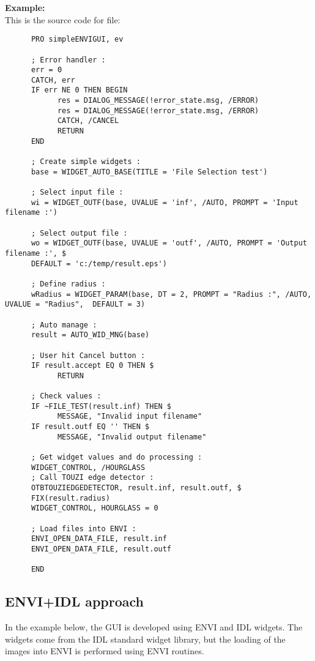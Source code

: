\textbf{Example:}\\
      This is the source code for  file:\\
\begin{verbatim}
      PRO simpleENVIGUI, ev

      ; Error handler :
      err = 0
      CATCH, err
      IF err NE 0 THEN BEGIN
            res = DIALOG_MESSAGE(!error_state.msg, /ERROR)
            res = DIALOG_MESSAGE(!error_state.msg, /ERROR)
            CATCH, /CANCEL
            RETURN
      END

      ; Create simple widgets :
      base = WIDGET_AUTO_BASE(TITLE = 'File Selection test')

      ; Select input file :
      wi = WIDGET_OUTF(base, UVALUE = 'inf', /AUTO, PROMPT = 'Input filename :')

      ; Select output file :
      wo = WIDGET_OUTF(base, UVALUE = 'outf', /AUTO, PROMPT = 'Output filename :', $
      DEFAULT = 'c:/temp/result.eps')

      ; Define radius :
      wRadius = WIDGET_PARAM(base, DT = 2, PROMPT = "Radius :", /AUTO, UVALUE = "Radius",  DEFAULT = 3)

      ; Auto manage :
      result = AUTO_WID_MNG(base)

      ; User hit Cancel button :
      IF result.accept EQ 0 THEN $
            RETURN

      ; Check values :
      IF ~FILE_TEST(result.inf) THEN $
            MESSAGE, "Invalid input filename"
      IF result.outf EQ '' THEN $
            MESSAGE, "Invalid output filename"

      ; Get widget values and do processing :
      WIDGET_CONTROL, /HOURGLASS
      ; Call TOUZI edge detector :
      OTBTOUZIEDGEDETECTOR, result.inf, result.outf, $
      FIX(result.radius)
      WIDGET_CONTROL, HOURGLASS = 0

      ; Load files into ENVI :
      ENVI_OPEN_DATA_FILE, result.inf
      ENVI_OPEN_DATA_FILE, result.outf

      END
\end{verbatim}

\subsection{ENVI+IDL approach}\label{enviidlapp}
In the example below, the GUI is developed using ENVI and IDL widgets. The widgets come from the IDL standard widget library, 
but the loading of the images into ENVI is performed using ENVI routines.

